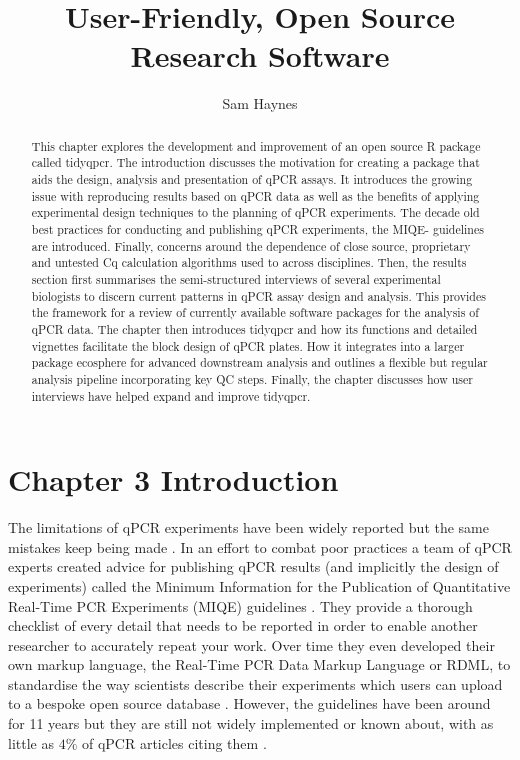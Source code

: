 \documentclass{SBCbookchapter}
\author{Sam Haynes}
\title{User-Friendly, Open Source Research Software}
\begin{document}
\maketitle

\begin{abstract}
This chapter explores the development and improvement of an open source R package called tidyqpcr. The introduction discusses the motivation for creating a package that aids the design, analysis and presentation of qPCR assays. It introduces the growing issue with reproducing results based on qPCR data as well as the benefits of applying experimental design techniques to the planning of qPCR experiments. The decade old best practices for conducting and publishing qPCR experiments, the MIQE- guidelines are introduced. Finally, concerns around the dependence of close source, proprietary and untested Cq calculation algorithms used to across disciplines. Then, the results section first summarises the semi-structured interviews of several experimental biologists to discern current patterns in qPCR assay design and analysis. This provides the framework for a review of currently available software packages for the analysis of qPCR data. The chapter then introduces tidyqpcr and how its functions and detailed vignettes facilitate the block design of qPCR plates. How it integrates into a larger package ecosphere for advanced downstream analysis and outlines a flexible but regular analysis pipeline incorporating key QC steps. Finally, the chapter discusses how user interviews have helped expand and improve tidyqpcr.


\end{abstract}

\section{Chapter 3 Introduction}

The limitations of qPCR experiments have been widely reported but the same mistakes keep being made \cite{Burns2005}. In an effort to combat poor practices a team of qPCR experts created advice for publishing qPCR results (and implicitly the design of experiments) called the Minimum Information for the Publication of Quantitative Real-Time PCR Experiments (MIQE) guidelines \cite{Bustin2009}. They provide a thorough checklist of every detail that needs to be reported in order to enable another researcher to accurately repeat your work. Over time they even developed their own markup language, the Real-Time PCR Data Markup Language or RDML, to standardise the way scientists describe their experiments which users can upload to a bespoke open source database \cite{Lefever2009, Ruijter2015}.
However, the guidelines have been around for 11 years but they are still not widely implemented or known about, with as little as $4\%$ of qPCR articles citing them \cite{AbdelNour2020}.
\end{document}
